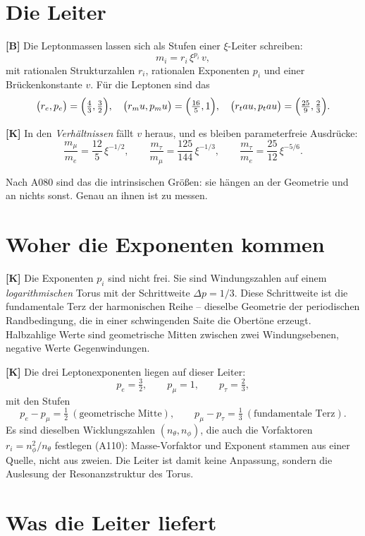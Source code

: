 \section{Die Leiter}

\textbf{[B]} Die Leptonmassen lassen sich als Stufen einer $\xi$-Leiter
schreiben:
\[
  m_i = r_i\,\xi^{p_i}\,v ,
\]
mit rationalen Strukturzahlen $r_i$, rationalen Exponenten $p_i$ und einer
Brückenkonstante $v$. Für die Leptonen sind das
\[
  \bigl(r_e,p_e\bigr) = \Bigl(\tfrac43,\tfrac32\Bigr),\quad
  \bigl(r_\mu,p_\mu\bigr) = \Bigl(\tfrac{16}{5},1\Bigr),\quad
  \bigl(r_\tau,p_\tau\bigr) = \Bigl(\tfrac{25}{9},\tfrac23\Bigr).
\]

\textbf{[K]} In den \emph{Verhältnissen} fällt $v$ heraus, und es bleiben
parameterfreie Ausdrücke:
\[
  \frac{m_\mu}{m_e} = \frac{12}{5}\,\xi^{-1/2},\qquad
  \frac{m_\tau}{m_\mu} = \frac{125}{144}\,\xi^{-1/3},\qquad
  \frac{m_\tau}{m_e} = \frac{25}{12}\,\xi^{-5/6}.
\]

Nach A080 sind das die intrinsischen Größen: sie hängen an der Geometrie und an
nichts sonst. Genau an ihnen ist zu messen.

\section{Woher die Exponenten kommen}

\textbf{[K]} Die Exponenten $p_i$ sind nicht frei. Sie sind Windungszahlen auf
einem \emph{logarithmischen} Torus mit der Schrittweite $\Delta p = 1/3$. Diese
Schrittweite ist die fundamentale Terz der harmonischen Reihe -- dieselbe
Geometrie der periodischen Randbedingung, die in einer schwingenden Saite die
Obertöne erzeugt. Halbzahlige Werte sind geometrische Mitten zwischen zwei
Windungsebenen, negative Werte Gegenwindungen.

\textbf{[K]} Die drei Leptonexponenten liegen auf dieser Leiter:
\[
  p_e = \tfrac32,\qquad p_\mu = 1,\qquad p_\tau = \tfrac23,
\]
mit den Stufen
\[
  p_e - p_\mu = \tfrac12 \ (\text{geometrische Mitte}),\qquad
  p_\mu - p_\tau = \tfrac13 \ (\text{fundamentale Terz}).
\]
Es sind dieselben Wicklungszahlen $(n_\theta, n_\phi)$, die auch die Vorfaktoren
$r_i = n_\phi^2/n_\theta$ festlegen (A110): Masse-Vorfaktor und
Exponent stammen aus einer Quelle, nicht aus zweien. Die Leiter ist damit keine
Anpassung, sondern die Auslesung der Resonanzstruktur des Torus.

\section{Was die Leiter liefert}

